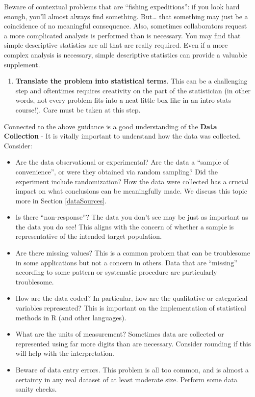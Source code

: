 \documentclass[
]{book}
\providecommand{\tightlist}{%
  \setlength{\itemsep}{0pt}\setlength{\parskip}{0pt}}
\begin{document}
Beware of contextual problems that are ``fishing expeditions'': if you look hard enough, you'll almost always find something. But\ldots{} that something may just be a coincidence of no meaningful consequence. Also, sometimes collaborators request a more complicated analysis is performed than is necessary. You may find that simple descriptive statistics are all that are really required. Even if a more complex analysis is necessary, simple descriptive statistics can provide a valuable supplement.

\begin{enumerate}
\def\labelenumi{\arabic{enumi}.}
\setcounter{enumi}{2}
\tightlist
\item
  \textbf{Translate the problem into statistical terms}. This can be a challenging step and oftentimes requires creativity on the part of the statistician (in other words, not every problem fits into a neat little box like in an intro stats course!). Care must be taken at this step.
\end{enumerate}

Connected to the above guidance is a good understanding of the \textbf{Data Collection} - It is vitally important to understand how the data was collected. Consider:

\begin{itemize}
\tightlist
\item
  Are the data observational or experimental? Are the data a ``sample of convenience'', or were they obtained via random sampling? Did the experiment include randomization? How the data were collected has a crucial impact on what conclusions can be meaningfully made. We discuss this topic more in Section \ref{dataSources}.
\item
  Is there ``non-response''? The data you don't see may be just as important as the data you do see! This aligns with the concern of whether a sample is representative of the intended target population.
\item
  Are there missing values? This is a common problem that can be troublesome in some applications but not a concern in others. Data that are ``missing'' according to some pattern or systematic procedure are particularly troublesome.
\item
  How are the data coded? In particular, how are the qualitative or categorical variables represented? This is important on the implementation of statistical methods in R (and other languages).
\item
  What are the units of measurement? Sometimes data are collected or represented using far more digits than are necessary. Consider rounding if this will help with the interpretation.
\item
  Beware of data entry errors. This problem is all too common, and is almost a certainty in any real dataset of at least moderate size. Perform some data sanity checks.
\end{itemize}
\end{document}

